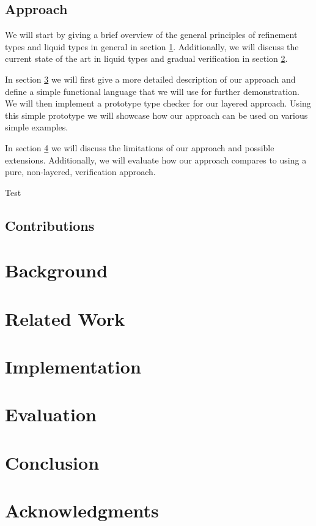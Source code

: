 \documentclass[acmsmall, review, screen]{acmart}
\begin{document}
\subsection{Approach}
We will start by giving a brief overview of the general principles of refinement types and liquid types in general in section \ref{sec:background}. Additionally, we will discuss the current state of the art in liquid types and gradual verification in section \ref{sec:related}. 

In section \ref{sec:implementation} we will first give a more detailed description of our approach and define a simple functional language that we will use for further demonstration. We will then implement a prototype type checker for our layered approach. Using this simple prototype we will showcase how our approach can be used on various simple examples.

In section \ref{sec:evaluation} we will discuss the limitations of our approach and possible extensions. Additionally, we will evaluate how our approach compares to using a pure, non-layered, verification approach.

Test

\subsection{Contributions}
\section{Background}
\label{sec:background}
\section{Related Work}
\label{sec:related}
\section{Implementation}
\label{sec:implementation}
\section{Evaluation}
\label{sec:evaluation}
\section{Conclusion}
\label{sec:conclusion}
\section{Acknowledgments}
\label{sec:acknowledgments}
\end{document}
